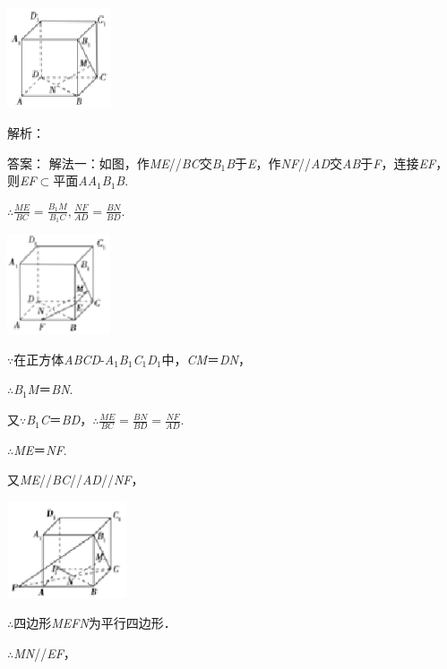 \documentclass{article} %
\begin{document}
\includegraphics*[width=1.21in, height=1.17in, keepaspectratio=false]{image142}

解析：

答案：
解法一：如图，作\textit{ME}//\textit{BC}交\textit{B}${}_{1}$\textit{B}于\textit{E}，作\textit{NF}//\textit{AD}交\textit{AB}于\textit{F}，连接\textit{EF}，则\textit{EF}$\mathrm{\subset }$平面\textit{AA}${}_{1}$\textit{B}${}_{1}$\textit{B}.

$\mathrm{\therefore}\frac{ME}{BC}=\frac{B_1M}{B_1C}, \frac{NF}{AD}=\frac{BN}{BD}$.

\includegraphics*[width=1.20in, height=1.16in, keepaspectratio=false]{image143}

$\mathrm{\because}$在正方体\textit{ABCD}-\textit{A}${}_{1}$\textit{B}${}_{1}$\textit{C}${}_{1}$\textit{D}${}_{1}$中，\textit{CM}＝\textit{DN}，

$\mathrm{\therefore}$\textit{B}${}_{1}$\textit{M}＝\textit{BN}.

又$\mathrm{\because}$\textit{B}${}_{1}$\textit{C}＝\textit{BD}，$\mathrm{\therefore}\frac{ME}{BC}=\frac{BN}{BD}=\frac{NF}{AD}$.

$\mathrm{\therefore}$\textit{ME}＝\textit{NF}.

又\textit{ME}//\textit{BC}//\textit{AD}//\textit{NF}，

\includegraphics*[width=1.40in, height=1.12in, keepaspectratio=false]{image144}

$\mathrm{\therefore}$四边形\textit{MEFN}为平行四边形．

$\mathrm{\therefore}$\textit{MN}//\textit{EF}，
\end{document}
